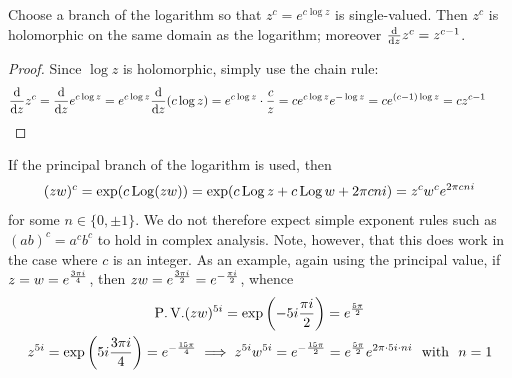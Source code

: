 \begin{lemm}{}{}
Choose a branch of the logarithm so that $z^c=e^{c\log z}$ is single-valued. Then $z^c$ is holomorphic on the same domain as the logarithm; moreover $\frac{\mathrm{d} }{\mathrm{d} z}z^c=z^{c-1}$.
\end{lemm}

\begin{proof}
Since $\log z$ is holomorphic, simply use the chain rule:
\[\frac{\mathrm{d} }{\mathrm{d} z}z^c=\frac{\mathrm{d} }{\mathrm{d} z}e^{c\log z}=e^{c\log z}\frac{\mathrm{d} }{\mathrm{d} z}(c\log z)=e^{c\log z}\cdot\frac cz =ce^{c\log z}e^{-\log z}=ce^{(c-1)\log z}=cz^{c-1}\tag*{\qedhere}\]
\end{proof}

\begin{example}{}{}
If the principal branch of the logarithm is used, then
  \[(zw)^c=\exp(c\operatorname{Log}(zw))=\exp(c\operatorname{Log} z+c\operatorname{Log} w+2\pi cni)=z^cw^ce^{2\pi cni}\]
  for some $n\in\{0,\pm 1\}$. We do not therefore expect simple exponent rules such as $(ab)^c=a^cb^c$ to hold in complex analysis. Note, however, that this does work in the case where $c$ is an integer.\smallbreak
  As an example, again using the principal value, if $z=w=e^{\frac{3\pi i}{4}}$, then $zw=e^{\frac{3\pi i}{2}}=e^{-\frac{\pi i}{2}}$, whence
  \begin{gather*}
  \operatorname{P.V.}(zw)^{5i}=\exp\left(-5i\frac{\pi i}2\right) =\polar{5\pi}2\\
  z^{5i}=\exp\left(5i\frac{3\pi i}4\right) =\polarn{15\pi}4 \implies z^{5i}w^{5i}=\polarn{15\pi}2 =\polar{5\pi}2e^{2\pi\cdot 5i\cdot ni}\ \text{ with } \ n=1
  \end{gather*}
\end{example}

